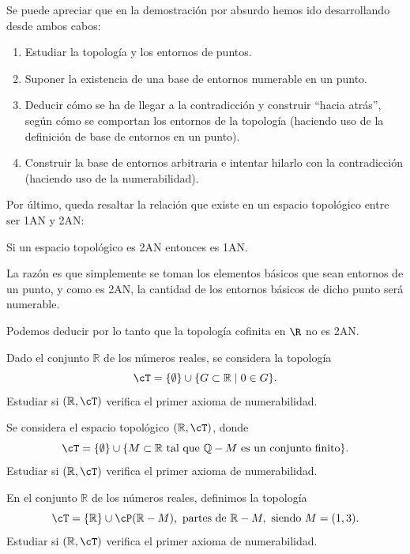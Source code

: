 Se puede apreciar que en la demostración por absurdo hemos ido desarrollando desde ambos cabos:
\begin{enumerate}
    \item Estudiar la topología y los entornos de puntos.
    \item Suponer la existencia de una base de entornos numerable en un punto.
    \item Deducir cómo se ha de llegar a la contradicción y construir ``hacia atrás'', según cómo se comportan los entornos de la topología (haciendo uso de la definición de base de entornos en un punto).
    \item Construir la base de entornos arbitraria e intentar hilarlo con la contradicción (haciendo uso de la numerabilidad).
\end{enumerate}

Por último, queda resaltar la relación que existe en un espacio topológico entre ser 1AN y 2AN:
\begin{prop}
    Si un espacio topológico es 2AN entonces es 1AN.

    La razón es que simplemente se toman los elementos básicos que sean entornos de un punto, y como es 2AN, la cantidad de los entornos básicos de dicho punto será numerable.
\end{prop}

Podemos deducir por lo tanto que la topología cofinita en $\R$ no es 2AN. 

{}

\begin{ex}
    Dado el conjunto \(\mathbb{R}\) de los números reales, se considera la topología 
    \[
        \cT = \{\emptyset\} \cup \{G \subset \mathbb{R} \mid 0 \in G\}.
    \]
    Estudiar si \((\mathbb{R},\cT)\) verifica el primer axioma de numerabilidad.
\end{ex}

\begin{ex}
    Se considera el espacio topológico \((\mathbb{R}, \cT)\), donde
    \[
        \cT = \{\emptyset\} \cup \{M \subset \mathbb{R} \text{ tal que } \mathbb{Q} - M \text{ es un conjunto finito}\}.
    \]
    Estudiar si \((\mathbb{R}, \cT)\) verifica el primer axioma de numerabilidad.
\end{ex}

\begin{ex}
    En el conjunto \(\mathbb{R}\) de los números reales, definimos la topología
    \[
        \cT = \{\mathbb{R}\} \cup \cP(\mathbb{R} - M), \text{ partes de } \mathbb{R} - M, \text{ siendo } M = (1,3).
    \]
    Estudiar si \((\mathbb{R},\cT)\) verifica el primer axioma de numerabilidad.
\end{ex}




